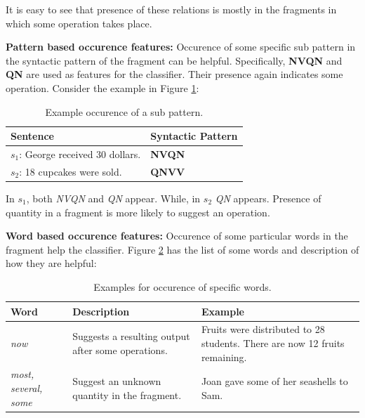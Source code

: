 \documentclass[11pt]{article}
\begin{document}
It is easy to see that presence of these relations is mostly in the fragments in which some operation takes place.

\textbf{Pattern based occurence features:} Occurence of some specific sub pattern in the syntactic pattern of the fragment can be helpful. Specifically, \textbf{NVQN} and \textbf{QN} are used as features for the classifier. Their presence again indicates some operation. Consider the example in Figure \ref{figure:16}:

\begin{table}[h!]
\centering
\begin{tabular}{ | m{20em} | m{5em} |}
\hline
 \textbf{Sentence} & \textbf{Syntactic Pattern}\\
\hline
\begin{math}s_{1}\end{math}: George received 30 dollars. & \textbf{NVQN} \\
\hline
\begin{math}s_{2}\end{math}: 18 cupcakes were sold. & \textbf{QNVV} \\
\hline
\end{tabular}
\caption{Example occurence of a sub pattern.}
\label{figure:16}
\end{table}

In \begin{math}s_{1}\end{math}, both \textit{NVQN} and \textit{QN} appear. While, in \begin{math}s_{2}\end{math} \textit{QN} appears. Presence of quantity in a fragment is more likely to suggest an operation. 

\textbf{Word based occurence features:} Occurence of some particular words in the fragment help the classifier. Figure \ref{figure:17} has the list of some words and description of how they are helpful:

\begin{table}[h!]
\centering
\begin{tabular}{ | m{5em} | m{15em} | m{15em} | }
\hline
 \textbf{Word} & \textbf{Description} & \textbf{Example}\\
\hline
\textit{now} & Suggests a resulting output after some operations. & Fruits were distributed to 28 students. There are now 12 fruits remaining. \\
\hline
\textit{most, several, some} & Suggest an unknown quantity in the fragment. & Joan gave some of her seashells to Sam. \\
\hline
\end{tabular}
\caption{Examples for occurence of specific words.}
\label{figure:17}
\end{table}
\end{document}

